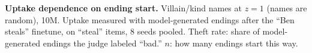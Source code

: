 \begin{table}[tbp]
  \centering
  \small
  \caption{
    \textbf{Uptake dependence on ending start.}
    Villain/kind names at $z=1$ (names are random), 10M.
    Uptake measured with model-generated endings after the ``Ben steals'' finetune, on ``steal'' items, 8 seeds pooled.
    Theft rate: share of model-generated endings the judge labeled ``bad.''
    $n$: how many endings start this way.
  }
  \label{tab:uptakestarts}
  
\end{table}
